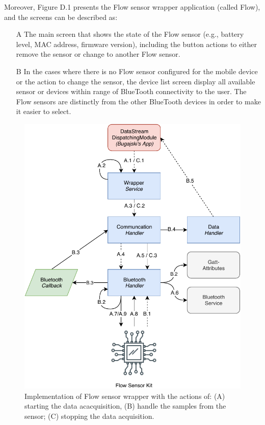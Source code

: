 Moreover, Figure D.1 presents the Flow sensor wrapper application (called Flow), and the screens can be described as: 

\begin{itemize}
    \item[A] The main screen that shows the state of the Flow sensor (e.g., battery level, MAC address, firmware version), including the button actions to either remove the sensor or change to another Flow sensor. 
    \item[B] In the cases where there is no Flow sensor configured for the mobile device or the action to change the sensor, the device list screen display all available sensor or devices within range of BlueTooth connectivity to the user. The Flow sensors are distinctly from the other BlueTooth devices in order to make it easier to select.
\end{itemize}

\begin{figure}
    \centering
    \includegraphics[scale=0.7]{images/Flow_Imp.pdf}
    \caption{Implementation of Flow sensor wrapper with the actions of: (A) starting the data acacquisition, (B) handle the samples from the sensor; (C) stopping the data acquisition.}
    \label{fig:impl_flowsensor}
\end{figure}

